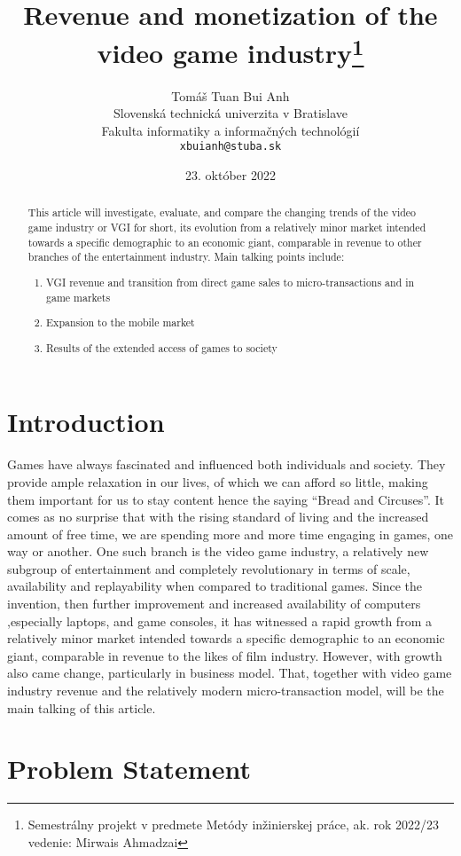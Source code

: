 \documentclass[10pt,british,a4paper,titlepage]{article}
\title{Revenue and monetization of the video game industry\thanks{Semestrálny projekt v predmete Metódy inžinierskej práce, ak. rok 2022/23 \\vedenie: Mirwais Ahmadzai}}
\author{Tomáš Tuan Bui Anh\\[2pt]
	{\small Slovenská technická univerzita v Bratislave}\\
	{\small Fakulta informatiky a informačných technológií}\\
	{\small \texttt{xbuianh@stuba.sk}}
	}
\date{\small 23. október 2022}
\begin{document}
\maketitle

\begin{abstract}
This article will investigate, evaluate, and compare the changing trends of the video game industry or VGI for short, its evolution from a relatively minor market intended towards a specific demographic to an economic giant, comparable in revenue to other branches of the entertainment industry. Main talking points include:
\begin{enumerate}
\item VGI revenue and transition from direct game sales to micro-transactions and in game markets
\item Expansion to the mobile market
\item Results of the extended access of games to society 
\end{enumerate}
\end{abstract}



\section{Introduction}

Games have always fascinated and influenced both individuals and society. They provide ample relaxation in our lives, of which we can afford so little, making them important for us to stay content hence the saying “Bread and Circuses”. It comes as no surprise that with the rising standard of living and the increased amount of free time, we are spending more and more time engaging in games, one way or another. One such branch is the video game industry, a relatively new subgroup of entertainment and completely revolutionary in terms of scale, availability and replayability when compared to traditional games. Since the invention, then further improvement and increased availability of computers ,especially laptops, and game consoles, it has witnessed a rapid growth from a relatively minor market intended towards a specific demographic to an economic giant, comparable in revenue to the likes of film industry. However, with growth also came change, particularly in business model. That, together with video game industry revenue and the relatively modern micro-transaction model, will be the main talking of this article.



\section{Problem Statement}
\end{document}
